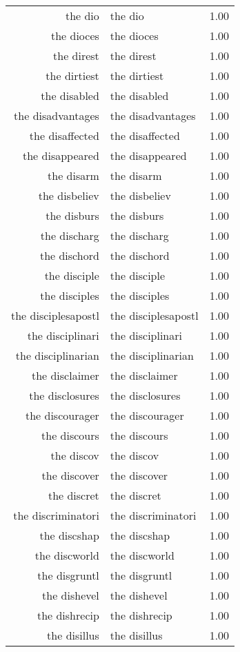 \begin{table}[ht]
\begin{tabular}{rlr}
  the dio & the dio & 1.00 \\ 
  the dioces & the dioces & 1.00 \\ 
  the direst & the direst & 1.00 \\ 
  the dirtiest & the dirtiest & 1.00 \\ 
  the disabled & the disabled & 1.00 \\ 
  the disadvantages & the disadvantages & 1.00 \\ 
  the disaffected & the disaffected & 1.00 \\ 
  the disappeared & the disappeared & 1.00 \\ 
  the disarm & the disarm & 1.00 \\ 
  the disbeliev & the disbeliev & 1.00 \\ 
  the disburs & the disburs & 1.00 \\ 
  the discharg & the discharg & 1.00 \\ 
  the dischord & the dischord & 1.00 \\ 
  the disciple & the disciple & 1.00 \\ 
  the disciples & the disciples & 1.00 \\ 
  the disciplesapostl & the disciplesapostl & 1.00 \\ 
  the disciplinari & the disciplinari & 1.00 \\ 
  the disciplinarian & the disciplinarian & 1.00 \\ 
  the disclaimer & the disclaimer & 1.00 \\ 
  the disclosures & the disclosures & 1.00 \\ 
  the discourager & the discourager & 1.00 \\ 
  the discours & the discours & 1.00 \\ 
  the discov & the discov & 1.00 \\ 
  the discover & the discover & 1.00 \\ 
  the discret & the discret & 1.00 \\ 
  the discriminatori & the discriminatori & 1.00 \\ 
  the discshap & the discshap & 1.00 \\ 
  the discworld & the discworld & 1.00 \\ 
  the disgruntl & the disgruntl & 1.00 \\ 
  the dishevel & the dishevel & 1.00 \\ 
  the dishrecip & the dishrecip & 1.00 \\ 
  the disillus & the disillus & 1.00 \\ 

\end{tabular}
\end{table}
